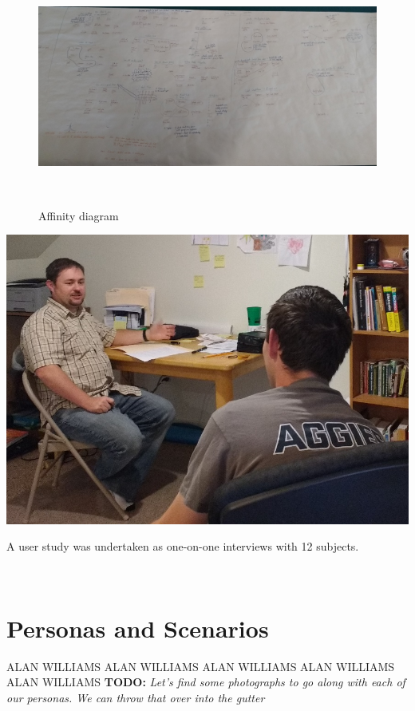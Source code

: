 \documentclass{sigchi-ext}
\begin{document}
\begin{figure}
  \includegraphics[width=0.9\columnwidth]{figures/affinity_diagram.jpg}
  \caption{Affinity diagram}~\label{fig:sample}
\end{figure}

\begin{marginfigure}[-15pc]
  \begin{minipage}{\marginparwidth}
    \centering
    \includegraphics[width=0.9\marginparwidth]{figures/user_study.jpg}
    \caption{A user study was undertaken as one-on-one interviews with 12 subjects.}~\label{fig:marginfig}
  \end{minipage}
\end{marginfigure}



\section{Personas and Scenarios}

ALAN WILLIAMS ALAN WILLIAMS ALAN WILLIAMS ALAN WILLIAMS ALAN WILLIAMS
\textbf{TODO:}
\textit{Let's find some photographs to go along with each of our personas.
We can throw that over into the gutter}
\end{document}
